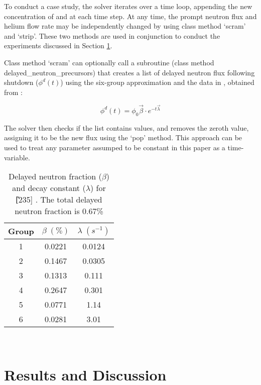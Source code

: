 To conduct a case study, the solver iterates over a time loop, appending the new concentration of \I and \Xe at each time step.  At any time, the prompt neutron flux and helium flow rate may be independently changed by using class method `scram' and `strip'. These two methods are used in conjunction to conduct the experiments discussed in Section \ref{sec-res}.

Class method `scram' can optionally call a subroutine (class method delayed\_neutron\_precursors) that creates a list of delayed neutron flux following shutdown ($\phi^{d}(t)$) using the six-group approximation and the data in , obtained from \cite{Kerlin}:

\begin{equation}\label{eq:dn_flux}
    \phi^{d}(t) = \phi_{0} \vec{\beta} \cdot e^{-t\vec{\lambda}}
\end{equation}

The solver then checks if the list contains values, and removes the zeroth value, assigning it to be the new flux using the `pop' method. This approach can be used to treat any parameter assumped to be constant in this paper as a time-variable.

\begin{table}[ht!]
    \caption[Delayed neutron data]{Delayed neutron fraction ($\beta$) and decay constant ($\lambda$) for \U[235] \cite{Kerlin}. The total delayed neutron fraction is 0.67\%}
    \centering\begin{tabular}{c|cc}
    Group  & $\beta \;(\%)$   & $\lambda \; (s^{-1})$ \\ \hline
        1  & 0.0221           & 0.0124 \\ 
        2  & 0.1467           & 0.0305 \\
        3  & 0.1313           & 0.111  \\ 
        4  & 0.2647           & 0.301  \\ 
        5  & 0.0771           & 1.14   \\ 
        6  & 0.0281           & 3.01   \\               
    \end{tabular}\\
    \label{tab:precursors}
\end{table}


\section{Results and Discussion} \label{sec-res}

